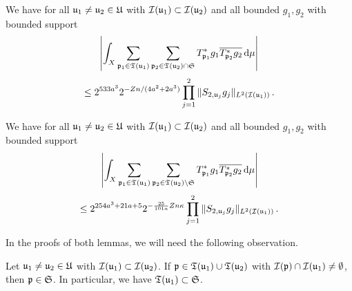 \begin{lemma}
        \label{correlation-distant-tree-parts}
        \leanok
        We have for all ${\mathfrak u}_1 \ne {\mathfrak u}_2 \in {\mathfrak U}$ with ${\mathcal{I}}({\mathfrak u}_1) \subset {\mathcal{I}}({\mathfrak u}_2)$ and all bounded $g_1, g_2$ with bounded support
      \begin{equation}
            \label{eq-lhs-big-sep-tree}
            \left| \int_X \sum_{{\mathfrak p}_1 \in {\mathfrak T}({\mathfrak u}_1)} \sum_{{\mathfrak p}_2 \in {\mathfrak T}({\mathfrak u}_2) \cap \mathfrak{S}} T^*_{{\mathfrak p}_1}g_1 \overline{T^*_{{\mathfrak p}_2}g_2 }\,\mathrm{d}\mu \right|
        \end{equation}
      \begin{equation}
            \label{eq-rhs-big-sep-tree}
            \le 2^{533a^3} 2^{-Zn/(4a^2 + 2a^3)} \prod_{j =1}^2 \| S_{2, {\mathfrak u}_j} g_j\|_{L^2({\mathcal{I}}({\mathfrak u}_1))}\,.
        \end{equation}
    \end{lemma}
    \begin{lemma}
        \label{correlation-near-tree-parts}
        \leanok
        We have for all ${\mathfrak u}_1 \ne {\mathfrak u}_2 \in {\mathfrak U}$ with ${\mathcal{I}}({\mathfrak u}_1) \subset {\mathcal{I}}({\mathfrak u}_2)$ and all bounded $g_1, g_2$ with bounded support
      \begin{equation}
            \label{eq-lhs-small-sep-tree}
            \left| \int_X \sum_{{\mathfrak p}_1 \in {\mathfrak T}({\mathfrak u}_1)} \sum_{{\mathfrak p}_2 \in {\mathfrak T}({\mathfrak u}_2) \setminus \mathfrak{S}} T^*_{{\mathfrak p}_1}g_1 \overline{T^*_{{\mathfrak p}_2}g_2 }\,\mathrm{d}\mu \right|
        \end{equation}
      \begin{equation}
            \label{eq-rhs-small-sep-tree}
            \le 2^{254a^3+21a+5} 2^{-\frac{25}{101a}Zn\kappa} \prod_{j=1}^2 \|S_{2, {\mathfrak u}_j} g_j\|_{L^2({\mathcal{I}}({\mathfrak u}_1))}\,.
        \end{equation}
    \end{lemma}

In the proofs of both lemmas, we will need the following observation.

\begin{lemma}
    \label{overlap-implies-distance}
    \leanok
    Let ${\mathfrak u}_1 \ne {\mathfrak u}_2 \in {\mathfrak U}$ with ${\mathcal{I}}({\mathfrak u}_1) \subset {\mathcal{I}}({\mathfrak u}_2)$. If ${\mathfrak p} \in {\mathfrak T}({\mathfrak u}_1) \cup {\mathfrak T}({\mathfrak u}_2)$ with ${\mathcal{I}}({\mathfrak p}) \cap {\mathcal{I}}({\mathfrak u}_1) \ne \emptyset$, then ${\mathfrak p} \in \mathfrak{S}$. In particular, we have ${\mathfrak T}({\mathfrak u}_1) \subset \mathfrak{S}$.
\end{lemma}

